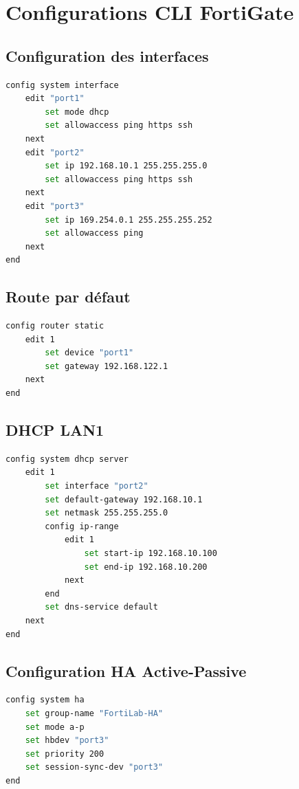 \chapter{Configurations CLI FortiGate}
\label{annexe:cli}

\section{Configuration des interfaces}

\begin{lstlisting}[language=bash, caption={Interfaces FGT-Primary}]
config system interface
    edit "port1"
        set mode dhcp
        set allowaccess ping https ssh
    next
    edit "port2"
        set ip 192.168.10.1 255.255.255.0
        set allowaccess ping https ssh
    next
    edit "port3"
        set ip 169.254.0.1 255.255.255.252
        set allowaccess ping
    next
end
\end{lstlisting}

\section{Route par défaut}

\begin{lstlisting}[language=bash, caption={Route vers Internet}]
config router static
    edit 1
        set device "port1"
        set gateway 192.168.122.1
    next
end
\end{lstlisting}

\section{DHCP LAN1}

\begin{lstlisting}[language=bash, caption={Serveur DHCP FGT-Primary}]
config system dhcp server
    edit 1
        set interface "port2"
        set default-gateway 192.168.10.1
        set netmask 255.255.255.0
        config ip-range
            edit 1
                set start-ip 192.168.10.100
                set end-ip 192.168.10.200
            next
        end
        set dns-service default
    next
end
\end{lstlisting}

\section{Configuration HA Active-Passive}

\begin{lstlisting}[language=bash, caption={HA --- FGT-Primary (actif)}]
config system ha
    set group-name "FortiLab-HA"
    set mode a-p
    set hbdev "port3"
    set priority 200
    set session-sync-dev "port3"
end
\end{lstlisting}

